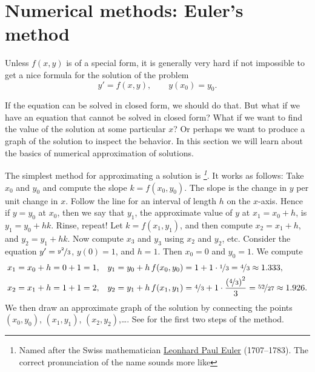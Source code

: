 
\sectionnewpage
\section{Numerical methods: Euler's method}
\label{numer:section}


%


Unless $f(x,y)$ is of a special form,
it is generally very hard
if not impossible to get a nice formula for the solution of the problem
\begin{equation*}
y' = f(x,y), \qquad y(x_0) = y_0 .
\end{equation*}

If the equation can be solved in closed form, we should do that.
But what if we have an equation that cannot be solved in closed form?
What if we want to find the value of the solution at some particular $x$?
Or perhaps we want to produce a graph of the solution to inspect the
behavior.  In this section we will learn about the basics of numerical
approximation of solutions.

The simplest method for approximating a solution is
\emph{%
\footnote{Named after the Swiss mathematician
\href{https://en.wikipedia.org/wiki/Euler}{Leonhard Paul Euler}
(1707--1783).  The correct pronunciation of the name sounds more
like }}.  It works as follows:
Take $x_0$ and $y_0$ and compute the slope $k = f(x_0,y_0)$.  The slope is the
change in $y$ per unit change in $x$.  Follow the line for an interval of
length $h$ on the $x$-axis.  Hence if $y = y_0$ at $x_0$, then we say that
$y_1$, the approximate value of $y$ at $x_1 = x_0 + h$, is
$y_1 = y_0 + h k$.
Rinse, repeat!  Let $k = f(x_1,y_1)$, and then compute
$x_2 = x_1 + h$, and $y_2 = y_1 + h k$.
Now compute $x_3$ and $y_3$ using $x_2$ and $y_2$, etc.
Consider the equation $y' = \nicefrac{y^2}{3}$, $y(0)=1$, and $h=1$.
Then $x_0=0$ and $y_0 = 1$.  We compute
\begin{align*}
& x_1 = x_0 + h = 0 + 1 = 1, & & y_1 = y_0 + h \, f(x_0,y_0) = 1 + 1 \cdot
\nicefrac{1}{3} = \nicefrac{4}{3} \approx 1.333,\\
& x_2 = x_1 + h = 1 + 1 = 2, & & y_2 = y_1 + h \, f(x_1,y_1) =
\nicefrac{4}{3} + 1 \cdot \frac{{(\nicefrac{4}{3})}^2}{3} =
\nicefrac{52}{27} \approx 1.926.
\end{align*}
We then draw an approximate graph of the solution by
connecting the points
$(x_0,y_0)$,
$(x_1,y_1)$,
$(x_2,y_2)$,\dots.
See 
for the first two steps of the method.

